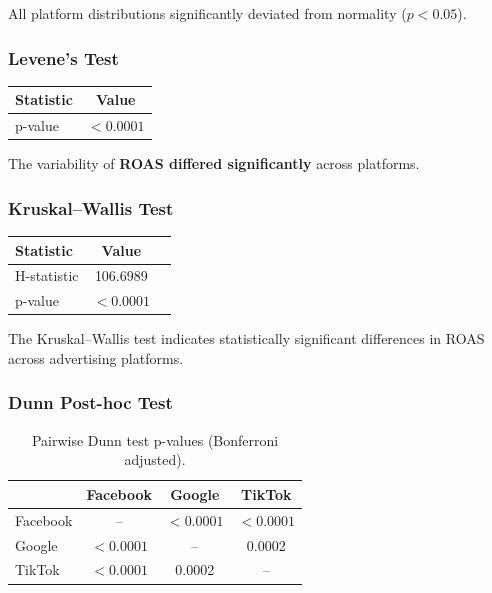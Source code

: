 All platform distributions significantly deviated from normality ($p<0.05$).

\vspace{0.3cm}

\subsubsection{Levene's Test}

\begin{table}[H]
	\centering
	\begin{tabular}{lc}
		\toprule
		Statistic & Value \\
		\midrule
		p-value & $<0.0001$ \\
		\bottomrule
	\end{tabular}
\end{table}

The variability of \textbf{ROAS differed significantly} across platforms.

\vspace{0.3cm}

\subsubsection{Kruskal--Wallis Test}

\begin{table}[H]
	\centering
	\begin{tabular}{lcc}
		\toprule
		Statistic & Value \\
		\midrule
		H-statistic & 106.6989 \\
		p-value & $<0.0001$ \\
		\bottomrule
	\end{tabular}
\end{table}

The Kruskal--Wallis test indicates statistically significant differences in ROAS across advertising platforms.

\vspace{0.3cm}

\subsubsection{Dunn Post-hoc Test}

\begin{table}[H]
	\centering
	\caption{Pairwise Dunn test p-values (Bonferroni adjusted).}
	\begin{tabular}{lccc}
		\toprule
		& Facebook & Google & TikTok \\
		\midrule
		Facebook & -- & $<0.0001$ & $<0.0001$ \\
		Google & $<0.0001$ & -- & 0.0002 \\
		TikTok & $<0.0001$ & 0.0002 & -- \\
		\bottomrule
	\end{tabular}
\end{table}

